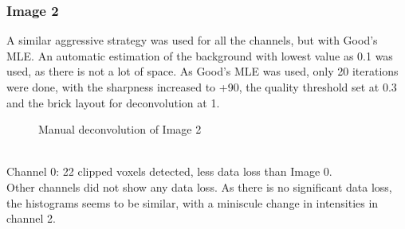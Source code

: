 \documentclass{article}
\begin{document}
\subsubsection*{Image 2}
A similar aggressive strategy was used for all the channels, but with Good's MLE. An automatic estimation of the background with lowest value as 0.1 was used, as there is not a lot of space. As Good's MLE was used, only 20 iterations were done, with the sharpness increased to +90, the quality threshold set at 0.3 and the brick layout for deconvolution at 1. 
\begin{figure}[h!]
\centering
{}
\vspace{5 mm}
\caption{Manual deconvolution of Image 2}
\label{fig:manual-deconvolve-image2}
\end{figure}
\\ 
Channel 0: 22 clipped voxels detected, less data loss than Image 0.\\ Other channels did not show any data loss. 
As there is no significant data loss, the histograms seems to be similar, with a miniscule change in intensities in channel 2. 
\end{document}
